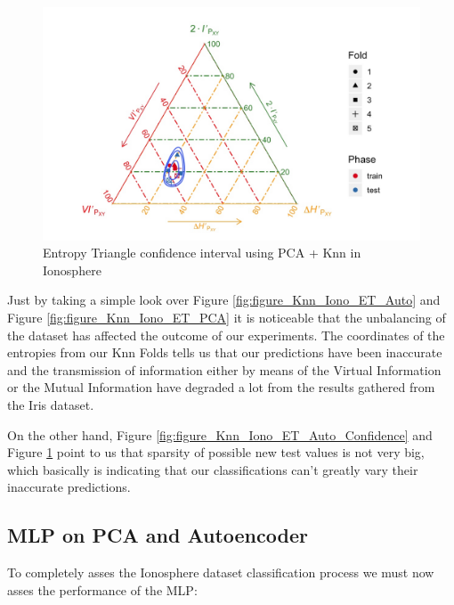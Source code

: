 \begin{figure}[H]
	\centering
	\includegraphics[width=\linewidth]{Figuras_tfg/ET_Iono_PCA_Knn_Confidence}
	\caption{Entropy Triangle confidence interval using PCA + Knn in Ionosphere}
	\label{fig:figure_Knn_Iono_ET_PCA_Confidence}
\end{figure}

Just by taking a simple look over Figure \ref{fig:figure_Knn_Iono_ET_Auto} and Figure \ref{fig:figure_Knn_Iono_ET_PCA} it is noticeable that the unbalancing of the dataset has affected the outcome of our experiments. The coordinates of the entropies from our Knn Folds tells us that our predictions have been inaccurate and the transmission of information either by means of the Virtual Information or the Mutual Information have degraded a lot from the results gathered from the Iris dataset. \par

On the other hand, Figure \ref{fig:figure_Knn_Iono_ET_Auto_Confidence} and Figure \ref{fig:figure_Knn_Iono_ET_PCA_Confidence} point to us that sparsity of possible new test values is not very big, which basically is indicating that our classifications can't greatly vary their inaccurate predictions.\par 

\subsection{MLP on PCA and Autoencoder}

To completely asses the Ionosphere dataset classification process we must now asses the performance of the MLP:

